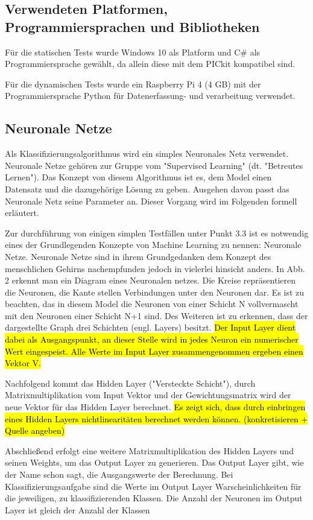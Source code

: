 \subsection{Verwendeten Platformen, Programmiersprachen und Bibliotheken}
\begin{flushleft}

Für die statischen Tests wurde Windows 10 als Platform und C# als Programmiersprache gewählt, da allein diese mit dem PICkit kompatibel sind. 

Für die dynamischen Tests wurde ein Raspberry Pi 4 (4 GB) mit der Programmiersprache Python für Datenerfassung- und verarbeitung verwendet.

\end{flushleft}

\subsection{Neuronale Netze}
\begin{flushleft}

Als Klassifizierungsalgorithmus wird ein simples Neuronales Netz verwendet. Neuronale Netze gehören zur Gruppe vom "Supervised Learning" (dt. "Betreutes Lernen"). Das Konzept von diesem Algorithmus ist es, dem Model einen Datensatz und die dazugehörige Lösung zu geben. Ausgehen davon passt das Neuronale Netz seine Parameter an. Dieser Vorgang wird im Folgenden formell erläutert.

Zur durchführung von einigen simplen Testfällen unter Punkt 3.3 ist es notwendig eines der Grundlegenden Konzepte von Machine Learning zu nennen: Neuronale Netze. Neuronale Netze sind in ihrem Grundgedanken dem Konzept des menschlichen Gehirns nachempfunden jedoch in vielerlei hinsicht anders. In Abb. 2 erkennt man ein Diagram eines Neuronalen netzes. Die Kreise repräsentieren die Neuronen, die Kante stellen Verbindungen unter den Neuronen dar. Es ist zu beachten, das in diesem Model die Neuronen von einer Schicht N vollvermascht mit den Neuronen einer Schicht N+1 sind. Des Weiteren ist zu erkennen, dass der dargestellte Graph drei Schichten (engl. Layers) besitzt. \hl{ Der Input Layer dient dabei als Ausgangspunkt, an dieser Stelle wird in jedes Neuron ein numerischer Wert eingespeist. Alle Werte im Input Layer zusammengenommen ergeben einen Vektor V.}

Nachfolgend kommt das Hidden Layer ("Versteckte Schicht"), durch Matrixmultiplikation vom Input Vektor und der Gewichtungsmatrix wird der neue Vektor für das Hidden Layer berechnet. \hl{Es zeigt sich, dass durch einbringen eines Hidden Layers nichtlinearitäten berechnet werden können. (konkretisieren + Quelle angeben)}

Abschließend erfolgt eine weitere Matrixmultiplikation des Hidden Layers und seinen Weights, um das Output Layer zu generieren. Das Output Layer gibt, wie der Name schon sagt, die Ausgangswerte der Berechnung. Bei Klassifizierungsaufgabe sind die Werte im Output Layer Warscheinlichkeiten für die jeweiligen, zu klassifizierenden Klassen. Die Anzahl der Neuronen im Output Layer ist gleich der Anzahl der Klassen
\end{flushleft}


